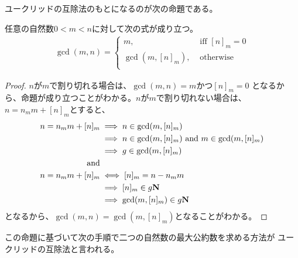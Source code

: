 	ユークリッドの互除法のもとになるのが次の命題である。

	\begin{proposition}[ユークリッドの互除法]
		任意の自然数$0<m<n$に対して次の式が成り立つ。
		\begin{equation*}\begin{split}
			\gcd(m, n) = \begin{cases}
				m, &\text{ iff } [n]_m = 0 \\
				\gcd(m, [n]_m), &\text{ otherwise } \\
			\end{cases}
		\end{split}\end{equation*}
	\label{prop:ユークリッドの互除法} %
	\end{proposition} %
	\begin{proof} $n$が$m$で割り切れる場合は、$\gcd(m, n)=m$かつ$[n]_m=0$
		となるから、命題が成り立つことがわかる。$n$が$m$で割り切れない場合は、
		$n = n_mm + [n]_m$とすると、
		\begin{equation*}\begin{split}
			n = n_mm + [n]_m &\implies n\in \gcd(m, [n]_m) \\
			&\implies n\in \gcd(m, [n]_m) \text{ and } m\in\gcd(m, [n]_m) \\
			&\implies g\in \gcd(m, [n]_m) \\
			\text{and} \\
			n = n_mm + [n]_m &\iff [n]_m = n - n_mm \\
			&\implies [n]_m\in g\mathbf{N} \\
			&\implies \gcd(m, [n]_m)\in g\mathbf{N} \\
		\end{split}\end{equation*}
		となるから、$\gcd(m,n)=\gcd(m,[n]_m)$となることがわかる。
	\end{proof}

	この命題に基づいて次の手順で二つの自然数の最大公約数を求める方法が
	ユークリッドの互除法と言われる。

